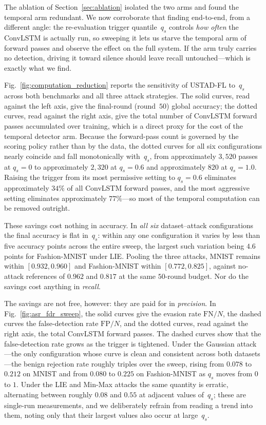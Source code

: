 \documentclass[journal]{IEEEtran}
\begin{document}
The ablation of Section~\ref{sec:ablation} isolated the two arms and found the temporal arm redundant. We now corroborate that finding end-to-end, from a different angle: the re-evaluation trigger quantile~$q_s$ controls \emph{how often} the ConvLSTM is actually run, so sweeping it lets us starve the temporal arm of forward passes and observe the effect on the full system. If the arm truly carries no detection, driving it toward silence should leave recall untouched---which is exactly what we find.

Fig.~\ref{fig:computation_reduction} reports the sensitivity of USTAD-FL to~$q_s$ across both benchmarks and all three attack strategies. The solid curves, read against the left axis, give the final-round (round~$50$) global accuracy; the dotted curves, read against the right axis, give the total number of ConvLSTM forward passes accumulated over training, which is a direct proxy for the cost of the temporal detector arm. Because the forward-pass count is governed by the scoring policy rather than by the data, the dotted curves for all six configurations nearly coincide and fall monotonically with~$q_s$, from approximately $3{,}520$ passes at $q_s = 0$ to approximately $2{,}320$ at $q_s = 0.6$ and approximately $820$ at $q_s = 1.0$. Raising the trigger from its most permissive setting to $q_s = 0.6$ eliminates approximately $34\%$ of all ConvLSTM forward passes, and the most aggressive setting eliminates approximately $77\%$---so most of the temporal computation can be removed outright.

These savings cost nothing in accuracy. In \emph{all six} dataset--attack configurations the final accuracy is flat in~$q_s$: within any one configuration it varies by less than five accuracy points across the entire sweep, the largest such variation being $4.6$ points for Fashion-MNIST under LIE. Pooling the three attacks, MNIST remains within $[0.932, 0.960]$ and Fashion-MNIST within $[0.772, 0.825]$, against no-attack references of $0.962$ and $0.817$ at the same $50$-round budget. Nor do the savings cost anything in \emph{recall}.

The savings are not free, however: they are paid for in \emph{precision}. In Fig.~\ref{fig:asr_fdr_sweep}, the solid curves give the evasion rate $\mathrm{FN}/N$, the dashed curves the false-detection rate $\mathrm{FP}/N$, and the dotted curves, read against the right axis, the total ConvLSTM forward passes. The dashed curves show that the false-detection rate grows as the trigger is tightened. Under the Gaussian attack---the only configuration whose curve is clean and consistent across both datasets---the benign rejection rate roughly triples over the sweep, rising from $0.078$ to $0.212$ on MNIST and from $0.080$ to $0.225$ on Fashion-MNIST as $q_s$ moves from $0$ to $1$. Under the LIE and Min-Max attacks the same quantity is erratic, alternating between roughly $0.08$ and $0.55$ at adjacent values of~$q_s$; these are single-run measurements, and we deliberately refrain from reading a trend into them, noting only that their largest values also occur at large~$q_s$.
\end{document}
